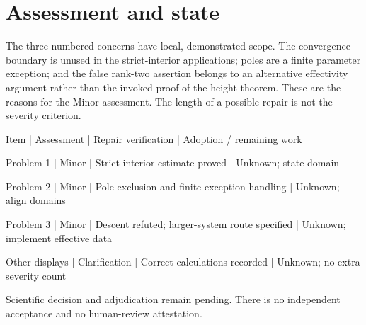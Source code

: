 \documentclass[10pt]{article}
\begin{document}
\section*{Assessment and state}
The three numbered concerns have local, demonstrated scope. The convergence boundary is unused in the strict-interior applications; poles are a finite parameter exception; and the false rank-two assertion belongs to an alternative effectivity argument rather than the invoked proof of the height theorem. These are the reasons for the Minor assessment. The length of a possible repair is not the severity criterion.\par
Item | Assessment | Repair verification | Adoption / remaining work\par
Problem 1 | Minor | Strict-interior estimate proved | Unknown; state domain\par
Problem 2 | Minor | Pole exclusion and finite-exception handling | Unknown; align domains\par
Problem 3 | Minor | Descent refuted; larger-system route specified | Unknown; implement effective data\par
Other displays | Clarification | Correct calculations recorded | Unknown; no extra severity count\par
Scientific decision and adjudication remain pending. There is no independent acceptance and no human-review attestation.\par
\end{document}
